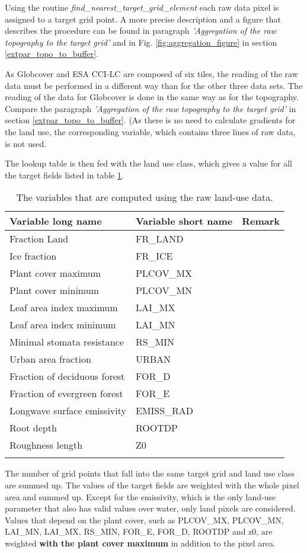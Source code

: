 \documentclass[a4paper,10pt,DIV14,BCOR1cm,titlepage,twoside]{scrartcl}
\providecommand{\tabularnewline}{\\}
\begin{document}
 Using the routine \textit{find\_nearest\_target\_grid\_element} each raw data pixel is assigned to a target grid point. A more precise description and a figure that describes the procedure can be found in paragraph \textit{'Aggregation of the raw topography to the target grid'} and in Fig. \ref{fig:aggregation_figure} in section \ref{extpar_topo_to_buffer}.\par\medskip\noindent
As Globcover and ESA CCI-LC are composed of six tiles, the reading of the raw data must be performed in a different way than for the other three data sets. The reading of the data for Globcover is done in the same way as for the topography. Compare the paragraph \textit{'Aggregation of the raw topography to the target grid'} in section \ref{extpar_topo_to_buffer}. (As there is no need to calculate gradients for the land use, the corresponding variable, which contains three lines of raw data, is not used. \par\medskip\noindent
The lookup table is then fed with  the land use class, which gives a value for all the target fields listed in table \ref{tab:target_fields_lu}.\par\medskip
\begin{longtable}{lll}
\textbf{Variable long name} & \textbf{Variable short name} &  \textbf{Remark} \tabularnewline
\hline
\endhead
\hline
Fraction Land & FR\_LAND  \tabularnewline
Ice fraction & FR\_ICE  \tabularnewline
Plant cover maximum & PLCOV\_MX  \tabularnewline
Plant cover minimum & PLCOV\_MN  \tabularnewline
Leaf area index maximum & LAI\_MX  \tabularnewline
Leaf area index minimum & LAI\_MN  \tabularnewline
Minimal stomata resistance & RS\_MIN  \tabularnewline
Urban area fraction & URBAN  \tabularnewline
Fraction of deciduous forest & FOR\_D  \tabularnewline
Fraction of evergreen forest & FOR\_E  \tabularnewline
Longwave surface emissivity & EMISS\_RAD  \tabularnewline
Root depth & ROOTDP  \tabularnewline
Roughness length & Z0  \tabularnewline
\bottomrule
\caption{The variables that are computed using the raw land-use data.}
\label{tab:target_fields_lu}
\end{longtable}
\noindent The number of grid points that fall into the same target grid and land use class are summed up. The values of the target fields are weighted with the whole pixel area and summed up. Except for the emissivity, which is the only land-use parameter that also has valid values over water, only land pixels are considered. Values that depend on the plant cover, such as PLCOV\_MX, PLCOV\_MN, LAI\_MN, LAI\_MX, RS\_MIN, FOR\_E, FOR\_D, ROOTDP and z0, are weighted \textbf{with the plant cover maximum} in addition to the pixel area. \par\medskip\noindent
\end{document}

